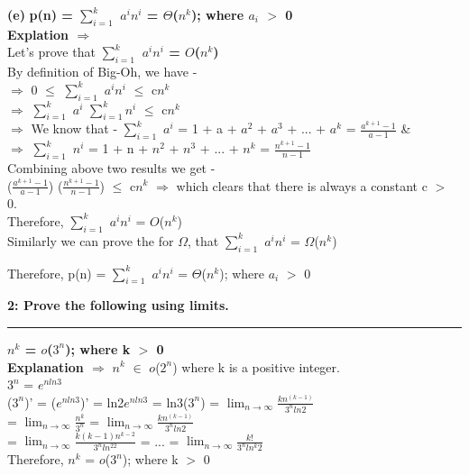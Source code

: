 \documentclass[12pt]{article}
\newcommand\question[3]{\vspace{.25in}\textbf{#1: #2}\vspace{.5em}\hrule\vspace{.10in}}
\renewcommand\part[1]{\vspace{.10in}\textbf{(#1)}}
\begin{document}
\part{e} \textbf{p(n) = $\sum_{i=1}^{k}$ $a^i$$n^i$ = $\Theta$($n^k$); where $a_{i}$ $>$ 0}
\\
\textbf{Explation $\Rightarrow$} \\Let's prove that \textbf{$\sum_{i=1}^{k}$ $a^i$$n^i$ = $O$($n^k$)}
\\ By definition of Big-Oh, we have - \\
$\Rightarrow$ 0 $\leq$ $\sum_{i=1}^{k}$ $a^i$$n^i$ $\leq$ c$n^k$ \\
$\Rightarrow$  $\sum_{i=1}^{k}$ $a^i$ $\sum_{i=1}^{k}$$n^i$ $\leq$ c$n^k$ \\
$\Rightarrow$ We know that - $\sum_{i=1}^{k}$ $a^i$ = 1 + a + $a^2$ + $a^3$ + ... + $a^k$ = $\frac{a^{k+1}-1}{a-1}$ \& \\
$\Rightarrow$ $\sum_{i=1}^{k}$ $n^i$ = 1 + n + $n^2$ + $n^3$ + ... + $n^k$ = $\frac{n^{k+1}-1}{n-1}$ \newline \\
Combining above two results we get - \newline \\
($\frac{a^{k+1}-1}{a-1}$) ($\frac{n^{k+1}-1}{n-1}$) $\leq$ c$n^k$
$\Rightarrow$ which clears that there is always a constant c $>$ 0. \newline \\Therefore, $\sum_{i=1}^{k}$ $a^i$$n^i$ = $O$($n^k$)
\newline \\ Similarly we can prove the for $\Omega$, that $\sum_{i=1}^{k}$ $a^i$$n^i$ = $\Omega$($n^k$)

Therefore, p(n) = $\sum_{i=1}^{k}$ $a^i$$n^i$ = $\Theta$($n^k$); where $a_{i}$ $>$ 0

\question{2}{Prove the following using limits.}

\part{a} \textbf{$n^k$ = $o$($3^n$); where k $>$ 0}
\\
\textbf{Explanation $\Rightarrow$} $n^k$ $\in$ $o$($2^n$) where k is a positive integer.
\\
$3^n$ = $e^{nln3}$
\\
($3^n$)' = ($e^{nln3}$)' = ln2$e^{nln3}$ = ln3($3^n$) = $\lim_{n\to\infty} \frac{kn^(k-1)}{3^nln2}$
\\
= $\lim_{n\to\infty} \frac{n^k}{3^n}$ = $\lim_{n\to\infty} \frac{kn^(k-1)}{3^nln2}$
\newline \\
 = $\lim_{n\to\infty} \frac{k(k-1)n^{k-2}}{3^nln^22}$ = ... = $\lim_{n\to\infty} \frac{k!}{3^nln^k2}$
\newline \\
Therefore, $n^k$ = $o$($3^n$); where k $>$ 0
\end{document}
